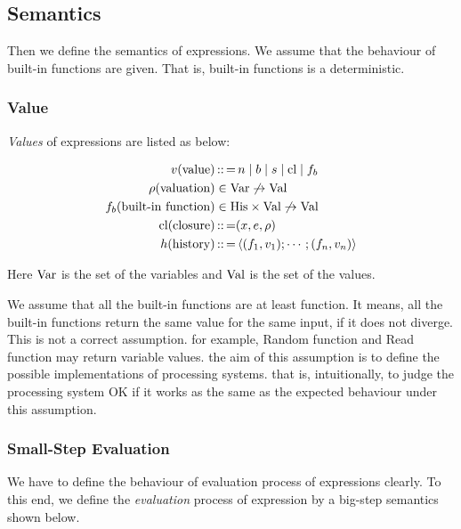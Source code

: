 
\subsection{Semantics}

Then we define the semantics of expressions.
We assume that the behaviour of built-in functions are given.
That is, built-in functions is a deterministic.

\subsubsection{Value}
\emph{Values} of expressions are listed as below:

\begin{align*}
    v (\text{value}) &\operatorname{:\!:=} n \mid b \mid  s \mid  \text{cl} \mid  f_b\\
    \rho  (\text{valuation}) &\in \text{Var} \not\to\text{Val} \\
    f_b{} (\text{built-in function})&\in \text{His} \times\text{Val}\not\to\text{Val}\\
    \text{cl} (\text{closure}) &\operatorname{:\!:=} (x,e,\rho{})\\
    h (\text{history}) &\operatorname{:\!:=} \left\langle (f_1, v_1); \cdots; (f_n, v_n) \right\rangle
\end{align*}



Here $\text{Var}$ is the set of the variables and $\text{Val}$ is the set of the values.

\begin{note}
We assume that all the built-in functions are at least function.
It means, all the built-in functions return the same value for the same input, if it does not diverge.
This is not a correct assumption. for example, Random function and Read function may return variable values.
the aim of this assumption is to define the possible implementations of processing systems.
that is, intuitionally, to judge the processing system OK if it works as the same as the expected behaviour under this assumption.
\end{note}

\subsubsection{Small-Step Evaluation}
We have to define the behaviour of evaluation process of expressions clearly.
To this end, we define the \emph{evaluation} process of expression by a big-step semantics shown below.


